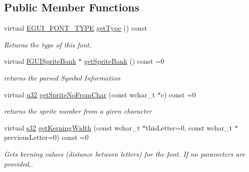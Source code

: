 \subsection*{Public Member Functions}
\begin{DoxyCompactItemize}
\item 
\mbox{\label{classirr_1_1gui_1_1IGUIFontBitmap_a8e4b5d7d84a71fcfcf3cbb96663be332}} 
virtual \hyperlink{namespaceirr_1_1gui_a3c818a164486f43300260327c5420a2f}{E\+G\+U\+I\+\_\+\+F\+O\+N\+T\+\_\+\+T\+Y\+PE} \hyperlink{classirr_1_1gui_1_1IGUIFontBitmap_a8e4b5d7d84a71fcfcf3cbb96663be332}{get\+Type} () const
\begin{DoxyCompactList}\small\item\em Returns the type of this font. \end{DoxyCompactList}\item 
\mbox{\label{classirr_1_1gui_1_1IGUIFontBitmap_ab9185a0c2e708958a8caae7bdeba9deb}} 
virtual \hyperlink{classirr_1_1gui_1_1IGUISpriteBank}{I\+G\+U\+I\+Sprite\+Bank} $\ast$ \hyperlink{classirr_1_1gui_1_1IGUIFontBitmap_ab9185a0c2e708958a8caae7bdeba9deb}{get\+Sprite\+Bank} () const =0
\begin{DoxyCompactList}\small\item\em returns the parsed Symbol Information \end{DoxyCompactList}\item 
\mbox{\label{classirr_1_1gui_1_1IGUIFontBitmap_a3c717559574dd9e63b3d5869c9ee321d}} 
virtual \hyperlink{namespaceirr_a0416a53257075833e7002efd0a18e804}{u32} \hyperlink{classirr_1_1gui_1_1IGUIFontBitmap_a3c717559574dd9e63b3d5869c9ee321d}{get\+Sprite\+No\+From\+Char} (const wchar\+\_\+t $\ast$c) const =0
\begin{DoxyCompactList}\small\item\em returns the sprite number from a given character \end{DoxyCompactList}\item 
virtual \hyperlink{namespaceirr_ac66849b7a6ed16e30ebede579f9b47c6}{s32} \hyperlink{classirr_1_1gui_1_1IGUIFontBitmap_a7bdeaea45745a10e09f7769ec3b95a12}{get\+Kerning\+Width} (const wchar\+\_\+t $\ast$this\+Letter=0, const wchar\+\_\+t $\ast$previous\+Letter=0) const =0
\begin{DoxyCompactList}\small\item\em Gets kerning values (distance between letters) for the font. If no parameters are provided,. \end{DoxyCompactList}\item 

\end{DoxyCompactItemize}
